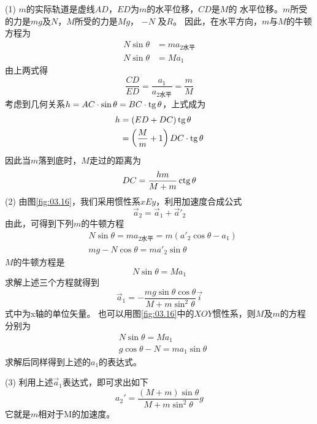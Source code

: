 \documentclass[../outline-of-mechanics.tex]{subfiles}
\begin{document}
(1) $ m $的实际轨道是虚线$ AD $，$ ED $为$ m $的水平位移，$ CD $是$ M $的
水平位移。$ m $所受的力是$ mg $及$ N $，$ M $所受的力是$ M g $， $ - N $ 及$ R $。
因此，在水平方向，$ m $与$ M $的牛顿方程为
\begin{align*}
  N \sin \theta & = m a _ { 2\text{水平} } \\
  N \sin \theta & = M a _ { 1 }
\end{align*}
由上两式得
\begin{equation*}
  \frac { C D } { E D } = \frac { a _ { 1 } } { a _ { 2\text{水平}}} = \frac { m } { M }
\end{equation*}
考虑到几何关系$ h = AC \cdot \sin \theta = BC \cdot \operatorname{tg} \theta $，上式成为
\begin{align*}
  h & = \left( E D + D C \right) \operatorname{tg} \theta                       \\
    & = \left( \frac { M } { m } + 1 \right) D C \cdot \operatorname{tg} \theta
\end{align*}
因此当$ m $落到底时，$ M $走过的距离为
\begin{equation*}
  D C = \frac { h m } { M + m } \operatorname{ctg} \theta
\end{equation*}
\clearpage
(2) 由图\ref{fig:03.16}，我们采用惯性系$ xEy $，利用加速度合成公式
\begin{equation*}
  \vec{a} _ { 2 } = \vec{a} _ { 1 } + \vec{a}' _ 2
\end{equation*}
由此，可得到下列$ m $的牛顿方程
\begin{align*}
   & N \sin \theta = m a _ { 2\text{水平} } = m \left( a '_2 \cos \theta - a _ { 1 } \right) \\
   & m g - N \cos \theta = m a' _ { 2 } \sin \theta
\end{align*}
$ M $的牛顿方程是
\begin{equation*}
  N \sin \theta = M a _ { 1 }
\end{equation*}
求解上述三个方程就得到
\begin{equation*}
  \vec{a} _ { 1 } = - \frac { m g \sin \theta \cos \theta} { M + m \sin ^ { 2 } \theta } \vec{i}
\end{equation*}式中为x轴的单位矢量。
也可以用图\ref{fig:03.16}\;中的$ XOY $惯性系，则$ M $及$ m $的方程分别为
\begin{align*}
   & N \sin \theta = M a _ { 1 }                 \\
   & g \cos \theta - N = m a _ { 1 } \sin \theta
\end{align*}
求解后同样得到上述的$ a_1 $的表达式。

(3) 利用上述$\vec{a}_1$表达式，即可求出如下
\begin{equation*}
  a _ 2 ' = \frac { \left( M + m \right) \sin \theta } { M + m \sin ^ { 2 } \theta } g
\end{equation*}
它就是$ m $相对于M的加速度。
\end{document}
